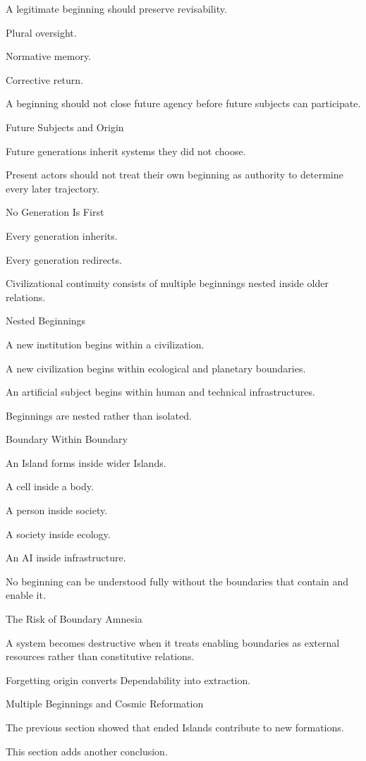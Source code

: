 A legitimate beginning should preserve revisability.

Plural oversight.

Normative memory.

Corrective return.

A beginning should not close future agency before future subjects can participate.

Future Subjects and Origin

Future generations inherit systems they did not choose.

Present actors should not treat their own beginning as authority to determine every later trajectory.

No Generation Is First

Every generation inherits.

Every generation redirects.

Civilizational continuity consists of multiple beginnings nested inside older relations.

Nested Beginnings

A new institution begins within a civilization.

A new civilization begins within ecological and planetary boundaries.

An artificial subject begins within human and technical infrastructures.

Beginnings are nested rather than isolated.

Boundary Within Boundary

An Island forms inside wider Islands.

A cell inside a body.

A person inside society.

A society inside ecology.

An AI inside infrastructure.

No beginning can be understood fully without the boundaries that contain and enable it.

The Risk of Boundary Amnesia

A system becomes destructive when it treats enabling boundaries as external resources rather than constitutive relations.

Forgetting origin converts Dependability into extraction.

Multiple Beginnings and Cosmic Reformation

The previous section showed that ended Islands contribute to new formations.

This section adds another conclusion.

